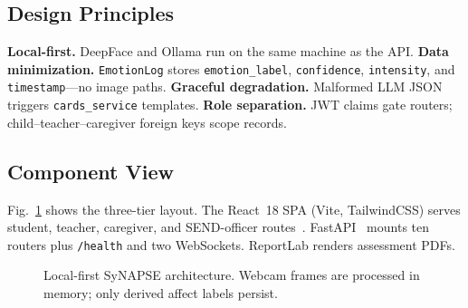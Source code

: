 \documentclass[conference]{IEEEtran}
\begin{document}
\subsection{Design Principles}
\textbf{Local-first.} DeepFace and Ollama run on the same machine as the API. \textbf{Data minimization.} \texttt{EmotionLog} stores \texttt{emotion\_label}, \texttt{confidence}, \texttt{intensity}, and \texttt{timestamp}---no image paths. \textbf{Graceful degradation.} Malformed LLM JSON triggers \texttt{cards\_service} templates. \textbf{Role separation.} JWT claims gate routers; child--teacher--caregiver foreign keys scope records.

\subsection{Component View}
Fig.~\ref{fig:arch} shows the three-tier layout. The React~18 SPA (Vite, TailwindCSS) serves student, teacher, caregiver, and SEND-officer routes~\cite{react2024}. FastAPI~\cite{ramirez2018} mounts ten routers plus \texttt{/health} and two WebSockets. ReportLab renders assessment PDFs.

\begin{figure}[!t]
\centering
{}
\caption{Local-first SyNAPSE architecture. Webcam frames are processed in memory; only derived affect labels persist.}
\label{fig:arch}
\end{figure}
\end{document}
